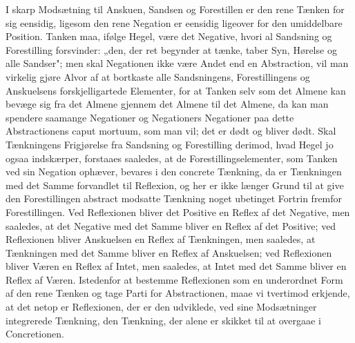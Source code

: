 \documentclass[12pt]{book}
\newcommand{\opage}[1]{\marginnote{\footnotesize\textit{[#1]}}}
\begin{document}
I skarp Modsætning til Anskuen, Sandsen og Forestillen er den rene Tænken for sig
eensidig, ligesom den rene Negation er eensidig ligeover for den umiddelbare
Position. Tanken maa, ifølge Hegel, være det Negative, hvori al Sandsning og
Forestilling forsvinder: „den, der ret begynder at tænke, taber Syn, Hørelse og
alle Sandser"; men skal Negationen ikke være Andet end en Abstraction, vil man
virkelig gjøre Alvor af at bortkaste alle Sandsningens, Forestillingens og
Anskuelsens forskjelligartede Elementer, for at Tanken selv som det Almene kan
bevæge sig fra det Almene gjennem det Almene til det Almene, da kan man spendere
saamange Negationer og Negationers Negationer paa dette Abstractionens caput
mortuum, som man vil; det er dødt og bliver dødt. Skal Tænkningens Frigjørelse fra
Sandsning og Forestilling derimod, hvad Hegel jo ogsaa indskærper, forstaaes
saaledes, at de Forestillingselementer, som Tanken ved
\opage{57} sin Negation ophæver, bevares i den concrete Tænkning, da er Tænkningen med det
Samme forvandlet til Reflexion, og her er ikke længer Grund til at give den
Forestillingen abstract modsatte Tænkning noget ubetinget Fortrin fremfor
Forestillingen. Ved Reflexionen bliver det Positive en Reflex af det Negative, men
saaledes, at det Negative med det Samme bliver en Reflex af det Positive; ved
Reflexionen bliver Anskuelsen en Reflex af Tænkningen, men saaledes, at Tænkningen
med det Samme bliver en Reflex af Anskuelsen; ved Reflexionen bliver Væren en
Reflex af Intet, men saaledes, at Intet med det Samme bliver en Reflex af Væren.
Istedenfor at bestemme Reflexionen som en underordnet Form af den rene Tænken og
tage Parti for Abstractionen, maae vi tvertimod erkjende, at det netop er
Reflexionen, der er den udviklede, ved sine Modsætninger integrerede Tænkning, den
Tænkning, der alene er skikket til at overgaae i Concretionen.
\end{document}
